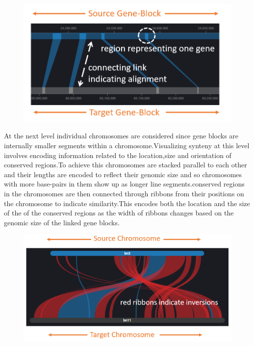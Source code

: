 \begin{figure}
  \centering
  \includegraphics[width=.50\linewidth]{images/ch_4_link_plot.PNG}
  \label{fig:ch_4_link_plot}
\end{figure}



At the next level individual chromosomes are considered since gene blocks are internally smaller segments within a chromosome.Visualizing synteny at this level involves encoding information related to the location,size and orientation of conserved regions.To achieve this chromosomes are stacked parallel to each other and their lengths are encoded to reflect their genomic size and so chromosomes with more base-pairs in them show up as longer line segments.conserved regions in the chromosomes are then connected through ribbons from their positions on the chromosome to indicate similarity.This encodes both the location and the size of the of the conserved regions as the width of ribbons changes based on the genomic size of the linked gene blocks.


\begin{figure}[h]
  \centering
  \includegraphics[width=.50\linewidth]{images/ch_4_link_plot_chromosome_a.PNG}
  \label{fig:ch_4_link_plot_chromosome_a}
\end{figure}


